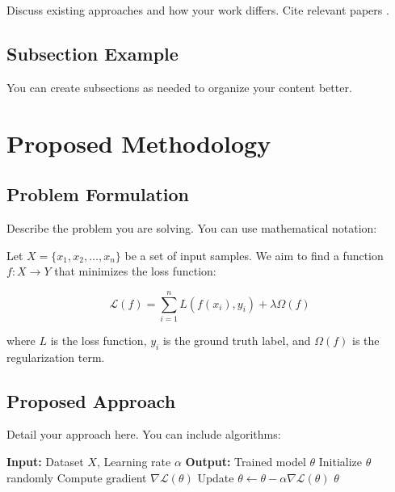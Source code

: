 \documentclass[conference]{IEEEtran}
\begin{document}
Discuss existing approaches and how your work differs. Cite relevant papers \cite{ref1, ref2}.

\subsection{Subsection Example}
You can create subsections as needed to organize your content better.

\section{Proposed Methodology}
\label{sec:methodology}

\subsection{Problem Formulation}
\label{subsec:problem}

Describe the problem you are solving. You can use mathematical notation:

Let $X = \{x_1, x_2, \ldots, x_n\}$ be a set of input samples. We aim to find a function $f: X \rightarrow Y$ that minimizes the loss function:

\begin{equation}
\mathcal{L}(f) = \sum_{i=1}^{n} L(f(x_i), y_i) + \lambda \Omega(f)
\label{eq:loss}
\end{equation}

where $L$ is the loss function, $y_i$ is the ground truth label, and $\Omega(f)$ is the regularization term.

\subsection{Proposed Approach}
\label{subsec:approach}

Detail your approach here. You can include algorithms:

\begin{algorithm}
\caption{Your Algorithm Name}
\begin{algorithmic}
\STATE \textbf{Input:} Dataset $X$, Learning rate $\alpha$
\STATE \textbf{Output:} Trained model $\theta$
\STATE Initialize $\theta$ randomly
\STATE Compute gradient $\nabla \mathcal{L}(\theta)$
\STATE Update $\theta \leftarrow \theta - \alpha \nabla \mathcal{L}(\theta)$
\ENDWHILE
\RETURN $\theta$
\end{algorithmic}
\end{algorithm}
\end{document}
